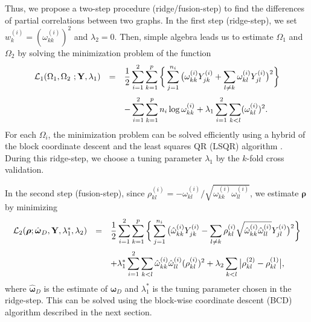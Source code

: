 \documentclass[useAMS,usenatbib,referee]{bio}
\newcommand{\bs}{\boldsymbol}
\begin{document}
{Thus, we propose a two-step procedure (ridge/fusion-step) to find the differences of partial correlations between two graphs.
In the first step (ridge-step), we set $w_k^{(i)}=(\omega_{kk}^{(i)})^2$ and $\lambda_2=0$. 
Then, simple algebra leads us to estimate $\Omega_1$ and $\Omega_2$ by solving the minimization problem of the function 
\begin{equation} \label{eqn:obj1}
\begin{array}{lll}  \medskip
{\mathcal L}_1(\Omega_1,\Omega_2~;\mathbf{Y},\lambda_1) &=& \displaystyle
 \frac{1}{2} \sum_{i=1}^2 \sum_{k=1}^p \bigg\{ \sum_{j=1}^{n_i} \big(\omega^{(i)}_{kk}Y_{jk}^{(i)} +  \sum_{l \neq k} \omega^{(i)}_{kl} Y_{jl}^{(i)} \big)^2 \bigg\}  \\
&& \displaystyle 
 -\sum_{i=1}^2 \sum_{k=1}^p {n_i} \log \omega^{(i)}_{kk} 
+ \lambda_1 \sum_{i=1}^2 \sum_{k<l} (\omega^{(i)}_{kl})^2.
\end{array}
\end{equation}
For each $\Omega_i$, the minimization problem can be solved efficiently using a hybrid of the block coordinate descent \citep{Khare2014} and the least squares QR (LSQR) algorithm \citep{Paige:1982}. 
During this ridge-step, we choose a tuning parameter $\lambda_1$ by the $k$-fold cross validation. 

In the second step (fusion-step), since $\rho_{kl}^{(i)}=-\omega_{kl}^{(i)}/\sqrt{\omega_{kk}^{(i)} \omega_{ll}^{(i)}}$, we estimate $\bs{\rho}$ by minimizing
\begin{equation} \label{eqn:obj2}
\begin{array}{lll}  \medskip
{\mathcal L}_2(\bs{\rho};\hat{\bs{\omega}}_D,\mathbf{Y},\lambda_1^*,\lambda_2) &=& \displaystyle
 \frac{1}{2} \sum_{i=1}^2 \sum_{k=1}^p \bigg\{ \sum_{j=1}^{n_i} \big(\hat{\omega}^{(i)}_{kk} Y_{jk}^{(i)} -  \sum_{l \neq k} \rho^{(i)}_{kl} \sqrt{\hat{\omega}^{(i)}_{kk} \hat{\omega}^{(i)}_{ll}}  Y_{jl}^{(i)} \big)^2 \bigg\}  \\
&& \displaystyle 
+ \lambda_1^* \sum_{i=1}^2 \sum_{k<l} \hat{\omega}^{(i)}_{kk} \hat{\omega}^{(i)}_{ll} (\rho^{(i)}_{kl})^2  + \lambda_2 \sum_{k<l} \big| \rho^{(2)}_{kl} - \rho^{(1)}_{kl} \big|,
\end{array} \medskip
\end{equation}
where  $\hat{\bs{\omega}}_D$ is the estimate of $\bs{\omega}_D$ and $\lambda_1^*$ is the tuning parameter chosen in the ridge-step. This can be solved using the block-wise coordinate descent (BCD) algorithm described in the next section.

}
\end{document}
